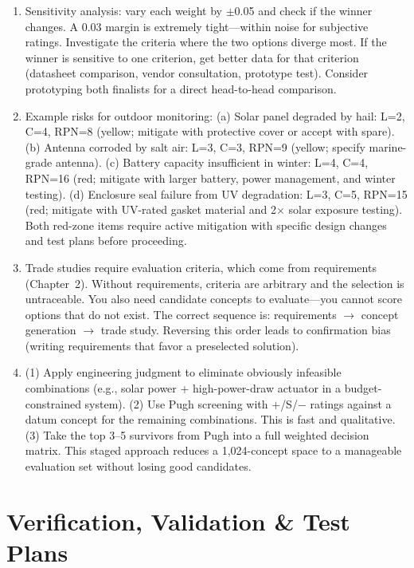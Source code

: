 \documentclass[11pt,letterpaper,twoside,openany]{book}
\begin{document}
\begin{enumerate}[leftmargin=1.5em]
\item Sensitivity analysis: vary each weight by $\pm$0.05 and check if the winner changes. A 0.03 margin is extremely tight---within noise for subjective ratings. Investigate the criteria where the two options diverge most. If the winner is sensitive to one criterion, get better data for that criterion (datasheet comparison, vendor consultation, prototype test). Consider prototyping both finalists for a direct head-to-head comparison.

\item Example risks for outdoor monitoring: (a) Solar panel degraded by hail: L=2, C=4, RPN=8 (yellow; mitigate with protective cover or accept with spare). (b) Antenna corroded by salt air: L=3, C=3, RPN=9 (yellow; specify marine-grade antenna). (c) Battery capacity insufficient in winter: L=4, C=4, RPN=16 (red; mitigate with larger battery, power management, and winter testing). (d) Enclosure seal failure from UV degradation: L=3, C=5, RPN=15 (red; mitigate with UV-rated gasket material and 2$\times$ solar exposure testing). Both red-zone items require active mitigation with specific design changes and test plans before proceeding.

\item Trade studies require evaluation criteria, which come from requirements (Chapter~2). Without requirements, criteria are arbitrary and the selection is untraceable. You also need candidate concepts to evaluate---you cannot score options that do not exist. The correct sequence is: requirements $\to$ concept generation $\to$ trade study. Reversing this order leads to confirmation bias (writing requirements that favor a preselected solution).

\item (1) Apply engineering judgment to eliminate obviously infeasible combinations (e.g., solar power + high-power-draw actuator in a budget-constrained system). (2) Use Pugh screening with $+$/S/$-$ ratings against a datum concept for the remaining combinations. This is fast and qualitative. (3) Take the top 3--5 survivors from Pugh into a full weighted decision matrix. This staged approach reduces a 1,024-concept space to a manageable evaluation set without losing good candidates.
\end{enumerate}

\FloatBarrier
\chapter{Verification, Validation \& Test Plans}
\end{document}
